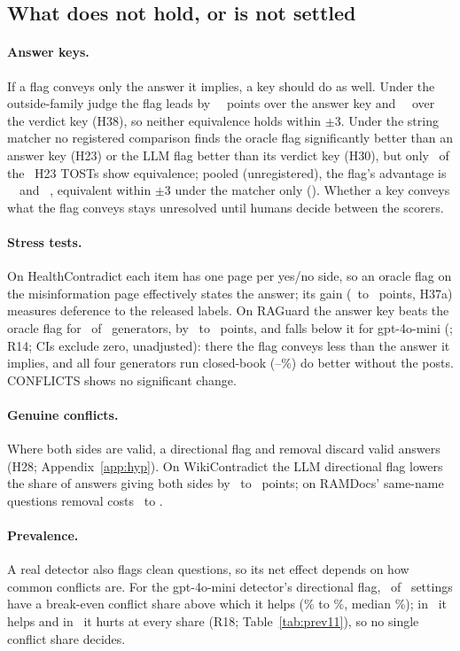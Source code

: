 \subsection{What does not hold, or is not settled}
\label{sec:open}

\paragraph{Answer keys.}
If a flag conveys only the answer it implies, a key should do as well. Under the outside-family judge the flag leads
by \jdTwentyThreeJ\ \jdTwentyThreeJCI\ points over the answer key and \jdThirtyJ\ \jdThirtyJCI\ over the verdict key
(H38), so neither equivalence holds within $\pm$3. Under the string matcher no registered comparison finds the
oracle flag significantly better than an answer key (H23) or the LLM flag better than its verdict key (H30), but only
\hTwentyThreeEqN\ of the \hTwentyThreeK\ H23 TOSTs show equivalence; pooled (unregistered), the flag's advantage is
\PoolTwentyThree\ \PoolTwentyThreeCI\ and \PoolThirtyA\ \PoolThirtyACI, equivalent within
$\pm$3 under the matcher only (). Whether a key conveys what the flag conveys stays unresolved until humans
decide between the scorers.

\paragraph{Stress tests.}
On HealthContradict each item has one page per yes/no side, so an oracle flag on the misinformation page effectively
states the answer; its gain (\hcDirMini\ to \hcDirHaiku\ points, H37a) measures deference to the released labels. On
RAGuard the answer key beats the oracle flag for \rgKeyAbove\ of \rgKeyGens\ generators, by \rgKeyKeyFlagHaiku\ to
\rgKeyKeyFlagLuna\ points, and falls below it for gpt-4o-mini (\rgKeyKeyFlagMini; R14; CIs exclude zero,
unadjusted): there the flag conveys less than the answer it implies, and all four generators run closed-book
(\rgCbMin--\rgCbMax\%) do better without the posts. CONFLICTS shows no significant change.

\paragraph{Genuine conflicts.}
Where both sides are valid, a directional flag and removal discard valid answers (H28; Appendix~\ref{app:hyp}). On
WikiContradict the LLM directional flag lowers the share of answers giving both sides by \ahTwentyEightWcMiniDir\ to
\ahTwentyEightWcLunaDir\ points; on RAMDocs' same-name questions removal costs \ahTwentyEightAmbMiniRem\ to
\ahTwentyEightAmbLunaRem.

\paragraph{Prevalence.}
A real detector also flags clean questions, so its net effect depends on how common conflicts are. For the
gpt-4o-mini detector's directional flag, \pvBeN\ of \pvN\ settings have a break-even conflict share above which it
helps (\pvBeMin\% to \pvBeMax\%, median \pvBeMedian\%); in \pvHelpsAll\ it helps and in \pvHurtsAll\ it hurts at
every share (R18; Table~\ref{tab:prev11}), so no single conflict share decides.
